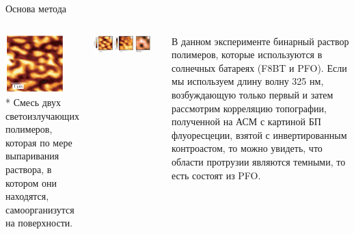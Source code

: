 \documentclass[9pt, compress, xcolor=table]{beamer}
\begin{document}
\begin{frame}{Основа метода}
\begin{columns}[c]
\column{5.5cm}
\begin{center}
\includegraphics[width=0.8\textwidth]{nfm34}
\\* Смесь двух светоизлучающих полимеров, которая по мере выпаривания раствора, в котором они находятся, самоорганизутся на поверхности.
\end{center}

\column{7cm}
\begin{center}
\includegraphics[width=0.9\textwidth]{nfm35}
\end{center}

В данном эксперименте бинарный раствор полимеров, которые используются в солнечных батареях (F8BT и PFO). Если мы используем длину волну 325 нм, возбуждающую только первый и затем рассмотрим корреляцию топографии, полученной на АСМ с картиной БП флуоресцеции, взятой с инвертированным контроастом, то можно увидеть, что области протрузии являются темными, то есть состоят из PFO. 

\end{columns}

\end{frame}
\end{document}
